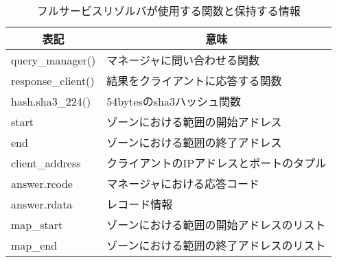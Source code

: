 \begin{table}[htb]
 \caption{フルサービスリゾルバが使用する関数と保持する情報}
 \centering
  \begin{tabular}{ll}
    \toprule
		\multicolumn{1}{c}{\textbf{表記}} & \multicolumn{1}{c}{\textbf{意味}} \\
    \midrule
		query\_manager() & マネージャに問い合わせる関数 \\
		response\_client() & 結果をクライアントに応答する関数 \\
		hash.sha3\_224() & 54bytesのsha3ハッシュ関数 \\
    start & ゾーンにおける範囲の開始アドレス \\
    end & ゾーンにおける範囲の終了アドレス \\
    client\_address & クライアントのIPアドレスとポートのタプル \\
		answer.rcode & マネージャにおける応答コード \\
		answer.rdata & レコード情報 \\
    map\_start & ゾーンにおける範囲の開始アドレスのリスト \\
    map\_end & ゾーンにおける範囲の終了アドレスのリスト \\
    \bottomrule
  \end{tabular}
 \label{tab:discription-fullresolv}
\end{table}
